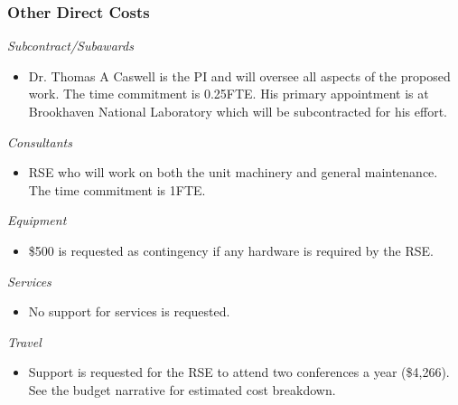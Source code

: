 \documentclass[12pt]{article}
\numberwithin{page}{section}
\begin{document}
\subsubsection{Other Direct Costs}
\textit{Subcontract/Subawards}
\begin{itemize}
\item Dr. Thomas A Caswell is the PI and will oversee all aspects of the
  proposed work.  The time commitment is 0.25FTE.  His primary
  appointment is at Brookhaven National Laboratory which will be
  subcontracted for his effort.
\end{itemize}
\textit{Consultants}
\begin{itemize}
\item RSE who will work on both the unit machinery and general
  maintenance.  The time commitment is 1FTE.
\end{itemize}
\textit{Equipment}
\begin{itemize}
\item \$500 is requested as contingency if any hardware is required by the RSE.
\end{itemize}
\textit{Services}
\begin{itemize}
\item No support for services is requested.
\end{itemize}
\textit{Travel}
\begin{itemize}
\item Support is requested for the RSE to attend two conferences a
  year (\$4,266).  See the budget narrative for estimated cost
  breakdown.
\end{itemize}
\end{document}
